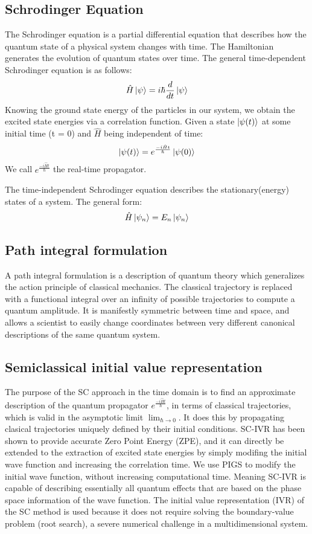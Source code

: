 \documentclass[12pt,letterpaper,oneside,final,titlepage]{article}               %
\numberwithin{equation}{section} %
\newcommand{\emiHt}{e^{\frac{-i\hat{H}t}{\hbar}}}
\begin{document}
\subsection{Schrodinger Equation}
The Schrodinger equation is a partial differential equation that describes how the quantum state of a physical system changes with time. 
The Hamiltonian generates the evolution of quantum states over time. 
The general time-dependent Schrodinger equation is as follows:
\begin{equation}
    \hat{H}\ket{\psi} = i\hbar\frac{d}{dt}\ket{\psi}
\end{equation}
Knowing the ground state energy of the particles in our system, we obtain the excited state energies via a correlation function.
Given a state $\ket{\psi(t)}$ at some initial time (t = 0) and $\hat{H}$ being independent of time:
\begin{equation}
    \ket{\psi(t)} = \emiHt\ket{\psi(0)}
\end{equation}
We call $\emiHt$ the real-time propagator.

The time-independent Schrodinger equation describes the stationary(energy) states of a system. 
The general form:
\begin{equation}
    \hat{H}\ket{\psi_{n}} = E_{n}\ket{\psi_{n}}
\end{equation}


\subsection{Path integral formulation}
A path integral formulation is a description of quantum theory which generalizes the action principle of classical mechanics.
The classical trajectory is replaced with a functional integral over an infinity of possible trajectories to compute a quantum amplitude.
It is manifestly symmetric between time and space, and allows a scientist to easily change coordinates between very different canonical descriptions of the same quantum system. 



\subsection{Semiclassical initial value representation}
The purpose of the SC approach in the time domain is to find an approximate description of the quantum propagator $\emiHt$, 
in terms of classical trajectories, which is valid in the asymptotic limit $\lim_{\hbar \to 0}$.
It does this by propagating clasical trajectories uniquely defined by their initial conditions.
SC-IVR has been shown to provide accurate Zero Point Energy (ZPE), and it can directly be extended to the extraction of excited state energies by simply modifing the initial wave function and increasing the correlation time. 
We use PIGS to modify the initial wave function, without increasing computational time. 
Meaning SC-IVR is capable of describing essentially all quantum effects that are based on the phase space information of the wave function.
The initial value representation (IVR) of the SC method is used because it does not require solving the boundary-value problem (root search), a severe numerical challenge in a multidimensional system. 
\end{document}
